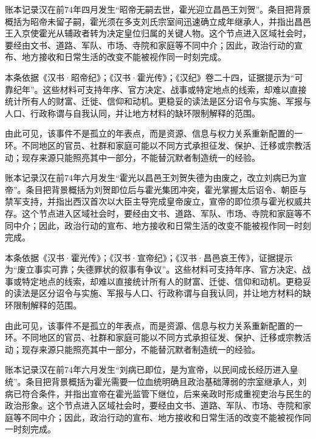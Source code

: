 账本记录汉在前74年四月发生“昭帝无嗣去世，霍光迎立昌邑王刘贺”。条目把背景概括为昭帝未留子嗣，霍光须在多支刘氏宗室间迅速确立成年继承人，并指出昌邑王入京使霍光从辅政者转为决定皇位归属的关键人物。这个节点进入区域社会时，要经由文书、道路、军队、市场、寺院和家庭等不同中介；因此，政治行动的宣布、地方接收和日常生活的改变不能被视作同一时刻完成。

本条依据《汉书·昭帝纪》；《汉书·霍光传》；《汉纪》卷二十四，证据提示为“可靠纪年”。这些材料可支持年序、官方决定、战事或特定地点的线索，却难以直接统计所有人的财富、迁徙、信仰和动机。更稳妥的读法是区分诏令与实施、军报与人口、行政称谓与自我认同，并让地方材料的缺环限制解释的范围。

由此可见，该事件不是孤立的年表点，而是资源、信息与权力关系重新配置的一环。不同地区的官员、社群和家庭可能以不同方式承担征发、保护、迁移或宗教活动；现存来源只能照亮其中一部分，不能替沉默者制造统一的经验。

账本记录汉在前74年六月发生“霍光以昌邑王刘贺失德为由废之，改立刘病已为宣帝”。条目把背景概括为刘贺即位后与霍光集团冲突，霍光掌握太后诏令、朝臣与禁军支持，并指出西汉首次以大臣主导完成皇帝废立，宣帝的即位须与霍光权威共存。这个节点进入区域社会时，要经由文书、道路、军队、市场、寺院和家庭等不同中介；因此，政治行动的宣布、地方接收和日常生活的改变不能被视作同一时刻完成。

本条依据《汉书·霍光传》；《汉书·宣帝纪》；《汉书·昌邑哀王传》，证据提示为“废立事实可靠；失德罪状的叙事有争议”。这些材料可支持年序、官方决定、战事或特定地点的线索，却难以直接统计所有人的财富、迁徙、信仰和动机。更稳妥的读法是区分诏令与实施、军报与人口、行政称谓与自我认同，并让地方材料的缺环限制解释的范围。

由此可见，该事件不是孤立的年表点，而是资源、信息与权力关系重新配置的一环。不同地区的官员、社群和家庭可能以不同方式承担征发、保护、迁移或宗教活动；现存来源只能照亮其中一部分，不能替沉默者制造统一的经验。

账本记录汉在前74年六月发生“刘病已即位，是为宣帝，以民间成长经历进入皇统”。条目把背景概括为霍光需要一位血统明确且政治基础薄弱的宗室继承人，刘病已符合条件，并指出宣帝在霍光监管下继位，后来亲政时形成重视吏治与民生的政治形象。这个节点进入区域社会时，要经由文书、道路、军队、市场、寺院和家庭等不同中介；因此，政治行动的宣布、地方接收和日常生活的改变不能被视作同一时刻完成。

